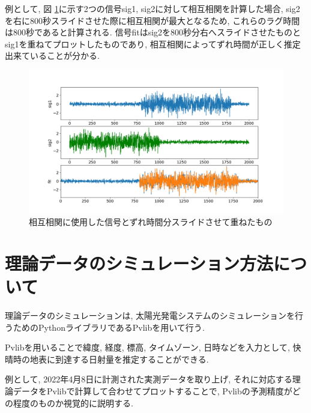 \documentclass[a4j,12pt,]{jarticle}
\begin{document}
例として, 図 \ref{p1}に示す2つの信号sig1, sig2に対して相互相関を計算した場合, sig2を右に800秒スライドさせた際に相互相関が最大となるため, これらのラグ時間は800秒であると計算される. 信号fitはsig2を800秒分右へスライドさせたものとsig1を重ねてプロットしたものであり, 相互相関によってずれ時間が正しく推定出来ていることが分かる.

\begin{figure}[H]
  \begin{center}
    \includegraphics[width=160mm]{corr_sample.png}
    \caption{相互相関に使用した信号とずれ時間分スライドさせて重ねたもの}
    \label{p1}
  \end{center}
\end{figure}

\section{理論データのシミュレーション方法について}
理論データのシミュレーションは, 太陽光発電システムのシミュレーションを行うためのPythonライブラリであるPvlibを用いて行う\cite{2}.

Pvlibを用いることで緯度, 経度, 標高, タイムゾーン, 日時などを入力として, 快晴時の地表に到達する日射量を推定することができる.

例として, 2022年4月8日に計測された実測データを取り上げ, それに対応する理論データをPvlibで計算して合わせてプロットすることで, Pvlibの予測精度がどの程度のものか視覚的に説明する.

\end{document}
